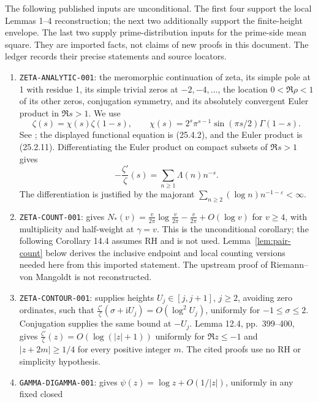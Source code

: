 \documentclass[11pt]{article}
\newcommand{\ii}{\mathrm i}
\newcommand{\ZL}{\frac{\zeta'}{\zeta}}
\begin{document}
The following published inputs are unconditional. The first four support
the local Lemmas 1--4 reconstruction; the next two additionally support
the finite-height envelope. The last two supply prime-distribution inputs
for the prime-side mean square.
They are imported facts, not claims of new proofs in this document.
The ledger records their precise statements and source locators.
\begin{enumerate}
\item \texttt{ZETA-ANALYTIC-001}: the meromorphic continuation of zeta,
its simple pole at 1 with residue 1, its simple trivial zeros at
\(-2,-4,\ldots\), the location \(0<\Re\rho<1\) of its other zeros,
conjugation symmetry, and its absolutely convergent Euler product in
\(\Re s>1\). We use
\[
 \zeta(s)=\chi(s)\zeta(1-s),\qquad
 \chi(s)=2^s\pi^{s-1}\sin(\pi s/2)\Gamma(1-s).
\]
See \cite[\S\S25.2(i), 25.2(iv), 25.4, 25.10(i)]{DLMF};
the displayed functional equation is (25.4.2), and the Euler product
is (25.2.11). Differentiating the Euler product on compact subsets of
\(\Re s>1\) gives
\begin{equation}\label{eq:euler-derivative}
 -\ZL(s)=\sum_{n\geq1}\Lambda(n)n^{-s}.
\end{equation}
The differentiation is justified by the majorant
\(\sum_{n\geq2}(\log n)n^{-1-\varepsilon}<\infty\).
\item \texttt{ZETA-COUNT-001}: \cite[Corollary 14.3, p.~454]{MV2007}
gives
\(N_*(v)=\frac{v}{2\pi}\log\frac{v}{2\pi}-\frac{v}{2\pi}
+O(\log v)\) for \(v\geq4\), with multiplicity and half-weight at
\(\gamma=v\). This is the unconditional corollary; the following
Corollary 14.4 assumes RH and is not used.
Lemma~\ref{lem:pair-count} below derives the inclusive endpoint and
local counting versions needed here from this imported statement.
The upstream proof of Riemann--von Mangoldt is not reconstructed.
\item \texttt{ZETA-CONTOUR-001}: \cite[Lemma 12.2, p.~398]{MV2007}
supplies heights \(U_j\in[j,j+1]\), \(j\geq2\), avoiding zero
ordinates, such that
\(\ZL(\sigma+\ii U_j)=O(\log^2 U_j)\), uniformly for
\(-1\leq\sigma\leq2\). Conjugation supplies the same bound at
\(-U_j\). Lemma 12.4, pp.~399--400, gives
\(\ZL(z)=O(\log(|z|+1))\) uniformly for \(\Re z\leq-1\) and
\(\lvert z+2m\rvert\geq1/4\) for every positive integer \(m\).
The cited proofs use no RH or simplicity hypothesis.
\item \texttt{GAMMA-DIGAMMA-001}: \cite[Theorem C.1, (C.17), p.~523]{MV2007}
gives \(\psi(z)=\log z+O(1/|z|)\), uniformly in any fixed closed

\end{enumerate}
\end{document}
